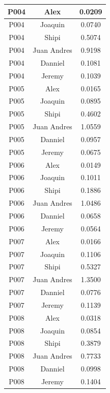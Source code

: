 \begin{longtable}{|c|c|c|}
    P004 & Alex        & 0.0209 \\ \hline
    P004 & Joaquin     & 0.0740 \\ \hline
    P004 & Shipi       & 0.5074 \\ \hline
    P004 & Juan Andres & 0.9198 \\ \hline
    P004 & Danniel     & 0.1081 \\ \hline
    P004 & Jeremy      & 0.1039 \\ \hline

    P005 & Alex        & 0.0165 \\ \hline
    P005 & Joaquin     & 0.0895 \\ \hline
    P005 & Shipi       & 0.4602 \\ \hline
    P005 & Juan Andres & 1.0559 \\ \hline
    P005 & Danniel     & 0.0957 \\ \hline
    P005 & Jeremy      & 0.0675 \\ \hline

    P006 & Alex        & 0.0149 \\ \hline
    P006 & Joaquin     & 0.1011 \\ \hline
    P006 & Shipi       & 0.1886 \\ \hline
    P006 & Juan Andres & 1.0486 \\ \hline
    P006 & Danniel     & 0.0658 \\ \hline
    P006 & Jeremy      & 0.0564 \\ \hline

    P007 & Alex        & 0.0166 \\ \hline
    P007 & Joaquin     & 0.1106 \\ \hline
    P007 & Shipi       & 0.5327 \\ \hline
    P007 & Juan Andres & 1.3500 \\ \hline
    P007 & Danniel     & 0.0776 \\ \hline
    P007 & Jeremy      & 0.1139 \\ \hline

    P008 & Alex        & 0.0318 \\ \hline
    P008 & Joaquin     & 0.0854 \\ \hline
    P008 & Shipi       & 0.3879 \\ \hline
    P008 & Juan Andres & 0.7733 \\ \hline
    P008 & Danniel     & 0.0998 \\ \hline
    P008 & Jeremy      & 0.1404 \\ \hline


\end{longtable}
